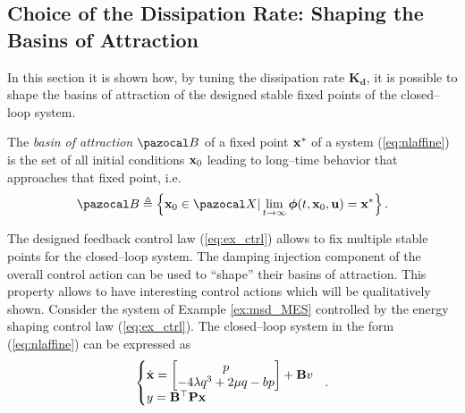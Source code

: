 \subsection{Choice of the Dissipation Rate: Shaping the Basins of Attraction}
%
In this section it is shown how, by tuning the dissipation rate $\mathbf{K_d}$, it is possible to shape the basins of attraction of the designed stable fixed points of the closed--loop system.
%
\begin{defn}
The \textit{basin of attraction} $\B$ of a fixed point $\mathbf{x}^*$ of a system (\ref{eq:nlaffine}) is the set of all initial conditions $\mathbf{x}_0$ leading to long--time behavior that approaches that fixed point, i.e.
%
\begin{equation}
    \B \triangleq \left\{\xb_0\in\X|\lim \limits_{t\rightarrow\infty}\bm\phi(t,\xb_0,\ub)=\xb^*\right\}.
\end{equation}
%
\end{defn}
%
The designed feedback control law (\ref{eq:ex_ctrl}) allows to fix multiple stable points for the closed--loop system. The damping injection component of the overall control action can be used to ``shape'' their basins of attraction. This property allows to have interesting control actions which will be qualitatively shown.
%
Consider the system of Example \ref{ex:msd_MES} controlled by the energy shaping control law (\ref{eq:ex_ctrl}). The closed--loop system in the form (\ref{eq:nlaffine}) can be expressed as
%
\begin{equation}
	\left\{
    \begin{matrix*}[l]
    \dot{\xb} = \begin{bmatrix}p\\-4\lambda q^3+2\mu q-bp\end{bmatrix} + \Bb v\\
    y = \Bb^\top \Pb\xb
    \end{matrix*}
    \right.~~.
\end{equation}
%

